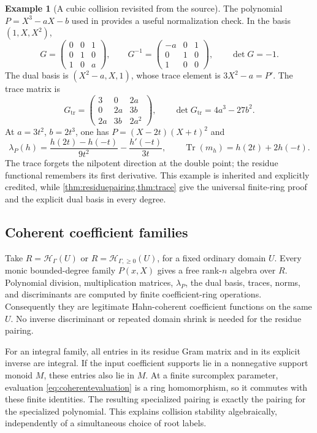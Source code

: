 \documentclass[11pt,letterpaper]{article}
\numberwithin{equation}{section}
\theoremstyle{definition}
\newtheorem{example}[example]{Example}
\theoremstyle{remark}
\newcommand{\HH}{\mathcal H_\Gamma}
\newcommand{\Tr}{\operatorname{Tr}}
\begin{document}
\begin{example}[A cubic collision revisited from the source]\label{ex:cubicduality}
The polynomial $P=X^3-aX-b$ used in \cite{SourceResearch} provides a useful
normalization check. In the basis $(1,X,X^2)$,
\[
 G=\begin{pmatrix}0&0&1\\0&1&0\\1&0&a\end{pmatrix},
 \qquad
 G^{-1}=\begin{pmatrix}-a&0&1\\0&1&0\\1&0&0\end{pmatrix},
 \qquad \det G=-1.
\]
The dual basis is $(X^2-a,X,1)$, whose trace element is $3X^2-a=P'$.
The trace matrix is
\[
 G_{\mathrm{tr}}=
 \begin{pmatrix}3&0&2a\\0&2a&3b\\2a&3b&2a^2\end{pmatrix},
 \qquad \det G_{\mathrm{tr}}=4a^3-27b^2.
\]
At $a=3t^2$, $b=2t^3$, one has $P=(X-2t)(X+t)^2$ and
\begin{equation}\label{eq:cubiccollision}
 \lambda_P(h)=\frac{h(2t)-h(-t)}{9t^2}-\frac{h'(-t)}{3t},
 \qquad \Tr(m_h)=h(2t)+2h(-t).
\end{equation}
The trace forgets the nilpotent direction at the double point; the residue
functional remembers its first derivative. This example is inherited and
explicitly credited, while \cref{thm:residuepairing,thm:trace} give the
universal finite-ring proof and the explicit dual basis in every degree.
\end{example}

\subsection{Coherent coefficient families}
Take $R=\HH(U)$ or $R=\mathcal H_{\Gamma,\ge0}(U)$, for a fixed ordinary
domain $U$. Every monic bounded-degree family $P(x,X)$ gives a free
rank-$n$ algebra over $R$. Polynomial division, multiplication matrices,
$\lambda_P$, the dual basis, traces, norms, and discriminants are computed
by finite coefficient-ring operations. Consequently they are legitimate
Hahn-coherent coefficient functions on the same $U$. No inverse
discriminant or repeated domain shrink is needed for the residue pairing.

For an integral family, all entries in its residue Gram matrix and in
its explicit inverse are integral. If the input coefficient supports lie
in a nonnegative support monoid $M$, these entries also lie in $M$.
At a finite surcomplex parameter, evaluation \eqref{eq:coherentevaluation}
is a ring homomorphism, so it commutes with these finite identities. The
resulting specialized pairing is exactly the pairing for the specialized
polynomial. This explains collision stability algebraically, independently
of a simultaneous choice of root labels.
\end{document}
